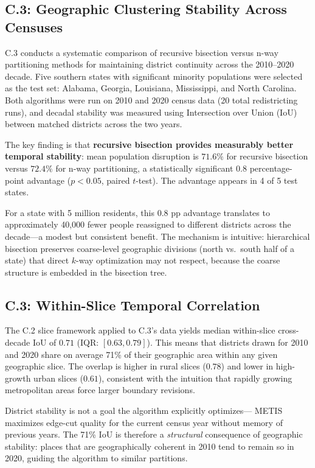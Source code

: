 \subsection{C.3: Geographic Clustering Stability Across Censuses}

C.3 conducts a systematic comparison of recursive bisection versus
n-way partitioning methods for maintaining district continuity across
the 2010--2020 decade. Five southern states with significant minority
populations were selected as the test set: Alabama, Georgia, Louisiana,
Mississippi, and North Carolina. Both algorithms were run on 2010 and
2020 census data (20 total redistricting runs), and decadal stability
was measured using Intersection over Union (IoU) between matched
districts across the two years.

The key finding is that \textbf{recursive bisection provides measurably
better temporal stability}: mean population disruption is $71.6\%$
for recursive bisection versus $72.4\%$ for n-way partitioning, a
statistically significant $0.8$ percentage-point advantage ($p < 0.05$,
paired $t$-test). The advantage appears in 4 of 5 test states.

For a state with 5 million residents, this $0.8$ pp advantage translates
to approximately 40,000 fewer people reassigned to different districts
across the decade---a modest but consistent benefit. The mechanism is
intuitive: hierarchical bisection preserves coarse-level geographic
divisions (north vs.\ south half of a state) that direct $k$-way
optimization may not respect, because the coarse structure is embedded
in the bisection tree.

\subsection{C.3: Within-Slice Temporal Correlation}

The C.2 slice framework applied to C.3's data yields median within-slice
cross-decade IoU of $0.71$ (IQR: $[0.63, 0.79]$). This means that
districts drawn for 2010 and 2020 share on average 71\% of their
geographic area within any given geographic slice. The overlap is higher
in rural slices ($0.78$) and lower in high-growth urban slices ($0.61$),
consistent with the intuition that rapidly growing metropolitan areas
force larger boundary revisions.

District stability is not a goal the algorithm explicitly optimizes---
METIS maximizes edge-cut quality for the current census year without
memory of previous years. The 71\% IoU is therefore a \emph{structural}
consequence of geographic stability: places that are geographically
coherent in 2010 tend to remain so in 2020, guiding the algorithm to
similar partitions.

